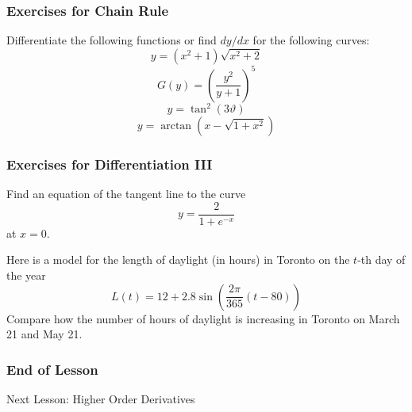\documentclass[xcolor=dvipsnames,handout]{beamer}
\begin{document}
\begin{frame}
  \frametitle{Exercises for Chain Rule}
{\ubung} Differentiate the following functions or find $dy/dx$ for the
following curves:
\begin{equation}
  \label{eq:athaazui}
  y=(x^{2}+1)\sqrt{x^{2}+2}
\end{equation}
\begin{equation}
  \label{eq:ahgoovim}
  G(y)=\left(\frac{y^{2}}{y+1}\right)^{5}
\end{equation}
\begin{equation}
  \label{eq:gaidaime}
  y=\tan^{2}(3\vartheta)
\end{equation}
\begin{equation}
  \label{eq:iefaigho}
  y=\arctan\left(x-\sqrt{1+x^{2}}\right)
\end{equation}
\end{frame}

\begin{frame}
  \frametitle{Exercises for Differentiation III}
{\ubung} Find an equation of the tangent line to the curve
\begin{equation}
  \label{eq:vaixohga}
  y=\frac{2}{1+e^{-x}}
\end{equation}
at $x=0$.

\bigskip

{\ubung} Here is a model for the length of daylight (in hours) in Toronto on
the $t$-th day of the year
\begin{equation}
  \label{eq:iefeuvae}
  L(t)=12+2.8\sin\left(\frac{2\pi}{365}(t-80)\right)
\end{equation}
Compare how the number of hours of daylight is increasing in Toronto
on March 21 and May 21.
\end{frame}

\begin{frame}
  \frametitle{End of Lesson}
Next Lesson: Higher Order Derivatives
\end{frame}
\end{document}
